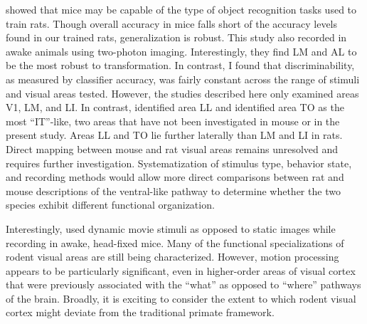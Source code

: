 
\citet{Froudarakis2020} showed that mice may be capable of the type of object recognition tasks used to train rats. Though overall accuracy in mice falls short of the accuracy levels found in our trained rats, generalization is robust. This study also recorded in awake animals using two-photon imaging. Interestingly, they find LM and AL to be the most robust to transformation. In contrast, I found that discriminability, as measured by classifier accuracy, was fairly constant across the range of stimuli and visual areas tested. However, the studies described here only examined areas V1, LM, and LI. In contrast, \citet{Tafazoli2017} identified area LL and \citet{Vermaercke2014} identified area TO as the most ``IT''-like, two areas that have not been investigated in mouse or in the present study. Areas LL and TO lie further laterally than LM and LI in rats. Direct mapping between mouse and rat visual areas remains unresolved and requires further investigation. Systematization of stimulus type, behavior state, and recording methods would allow more direct comparisons between rat and mouse descriptions of the ventral-like pathway to determine whether the two species exhibit different functional organization. 

Interestingly, \citet{Froudarakis2020} used dynamic movie stimuli as opposed to static images while recording in awake, head-fixed mice. Many of the functional specializations of rodent visual areas are still being characterized. However, motion processing appears to be particularly significant, even in higher-order areas of visual cortex that were previously associated with the ``what'' as opposed to ``where'' pathways of the brain. Broadly, it is exciting to consider the extent to which rodent visual cortex might deviate from the traditional primate framework. 

